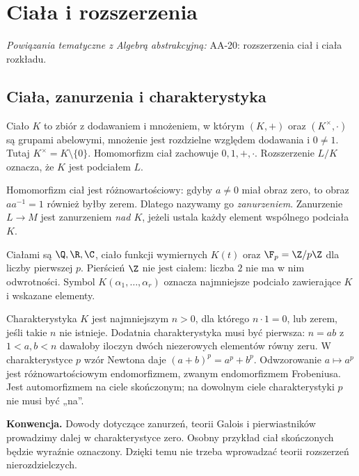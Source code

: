\chapter{Ciała i rozszerzenia}

\providecommand{\atlasref}[2]{#2}
\noindent\emph{Powiązania tematyczne z Algebrą abstrakcyjną:} \atlasref{AA-20::aa:ch:field-extensions}{AA-20: rozszerzenia ciał i ciała rozkładu}.


\section{Ciała, zanurzenia i charakterystyka}

\begin{definicja}
Ciało $K$ to zbiór z dodawaniem i mnożeniem, w którym $(K,+)$ oraz $(K^\times,\cdot)$ są grupami abelowymi, mnożenie jest rozdzielne względem dodawania i $0\ne1$. Tutaj $K^\times=K\setminus\{0\}$. Homomorfizm ciał zachowuje $0,1,+,\cdot$. Rozszerzenie $L/K$ oznacza, że $K$ jest podciałem $L$.
\end{definicja}

Homomorfizm ciał jest różnowartościowy: gdyby $a\ne0$ miał obraz zero, to obraz $aa^{-1}=1$ również byłby zerem. Dlatego nazywamy go \emph{zanurzeniem}. Zanurzenie $L\to M$ jest zanurzeniem \emph{nad $K$}, jeżeli ustala każdy element wspólnego podciała $K$.

\begin{przyklad}
Ciałami są $\Q,\R,\C$, ciało funkcji wymiernych $K(t)$ oraz $\F_p=\Z/p\Z$ dla liczby pierwszej $p$. Pierścień $\Z$ nie jest ciałem: liczba $2$ nie ma w nim odwrotności. Symbol $K(\alpha_1,\dots,\alpha_r)$ oznacza najmniejsze podciało zawierające $K$ i wskazane elementy.
\end{przyklad}

Charakterystyka $K$ jest najmniejszym $n>0$, dla którego $n\cdot1=0$, lub zerem, jeśli takie $n$ nie istnieje. Dodatnia charakterystyka musi być pierwsza: $n=ab$ z $1<a,b<n$ dawałoby iloczyn dwóch niezerowych elementów równy zeru. W charakterystyce $p$ wzór Newtona daje $(a+b)^p=a^p+b^p$. Odwzorowanie $a\mapsto a^p$ jest różnowartościowym endomorfizmem, zwanym endomorfizmem Frobeniusa. Jest automorfizmem na ciele skończonym; na dowolnym ciele charakterystyki $p$ nie musi być „na”.

\noindent\textbf{Konwencja.} Dowody dotyczące zanurzeń, teorii Galois i pierwiastników prowadzimy dalej w charakterystyce zero. Osobny przykład ciał skończonych będzie wyraźnie oznaczony. Dzięki temu nie trzeba wprowadzać teorii rozszerzeń nierozdzielczych.

